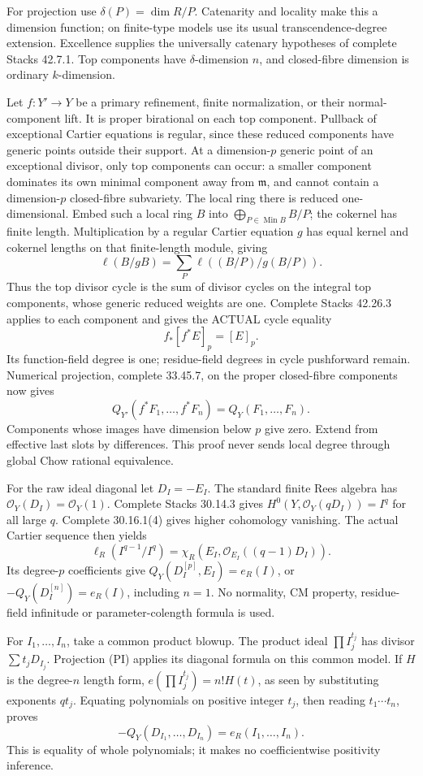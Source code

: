 \documentclass[11pt]{article}
\begin{document}
For projection use \(\delta(P)=\dim R/P\). Catenarity and locality make this a dimension function; on finite-type models use its usual transcendence-degree extension. Excellence supplies the universally catenary hypotheses of complete Stacks 42.7.1. Top components have \(\delta\)-dimension \(n\), and closed-fibre dimension is ordinary \(k\)-dimension.

Let \(f:Y'\to Y\) be a primary refinement, finite normalization, or their normal-component lift. It is proper birational on each top component. Pullback of exceptional Cartier equations is regular, since these reduced components have generic points outside their support. At a dimension-\(p\) generic point of an exceptional divisor, only top components can occur: a smaller component dominates its own minimal component away from \(\mathfrak m\), and cannot contain a dimension-\(p\) closed-fibre subvariety. The local ring there is reduced one-dimensional. Embed such a local ring \(B\) into \(\bigoplus_{P\in\operatorname{Min}B}B/P\); the cokernel has finite length. Multiplication by a regular Cartier equation \(g\) has equal kernel and cokernel lengths on that finite-length module, giving
\[
\ell(B/gB)=\sum_P\ell((B/P)/g(B/P)).
\]
Thus the top divisor cycle is the sum of divisor cycles on the integral top components, whose generic reduced weights are one. Complete Stacks 42.26.3 applies to each component and gives the ACTUAL cycle equality
\[
f_*[f^*E]_p=[E]_p. \tag{P}
\]
Its function-field degree is one; residue-field degrees in cycle pushforward remain. Numerical projection, complete 33.45.7, on the proper closed-fibre components now gives
\[
Q_{Y'}(f^*F_1,\ldots,f^*F_n)=Q_Y(F_1,\ldots,F_n). \tag{PI}
\]
Components whose images have dimension below \(p\) give zero. Extend from effective last slots by differences. This proof never sends local degree through global Chow rational equivalence.

For the raw ideal diagonal let \(D_I=-E_I\). The standard finite Rees algebra has \(\mathcal O_Y(D_I)=\mathcal O_Y(1)\). Complete Stacks 30.14.3 gives \(H^0(Y,\mathcal O_Y(qD_I))=I^q\) for all large \(q\). Complete 30.16.1(4) gives higher cohomology vanishing. The actual Cartier sequence then yields
\[
\ell_R(I^{q-1}/I^q)=\chi_R(E_I,\mathcal O_{E_I}((q-1)D_I)).
\]
Its degree-\(p\) coefficients give \(Q_Y(D_I^{[p]},E_I)=e_R(I)\), or \(-Q_Y(D_I^{[n]})=e_R(I)\), including \(n=1\). No normality, CM property, residue-field infinitude or parameter-colength formula is used.

For \(I_1,\ldots,I_n\), take a common product blowup. The product ideal \(\prod I_j^{t_j}\) has divisor \(\sum t_jD_{I_j}\). Projection (PI) applies its diagonal formula on this common model. If \(H\) is the degree-\(n\) length form, \(e(\prod I_j^{t_j})=n!H(t)\), as seen by substituting exponents \(q t_j\). Equating polynomials on positive integer \(t_j\), then reading \(t_1\cdots t_n\), proves
\[
-Q_Y(D_{I_1},\ldots,D_{I_n})=e_R(I_1,\ldots,I_n). \tag{I}
\]
This is equality of whole polynomials; it makes no coefficientwise positivity inference.
\end{document}
